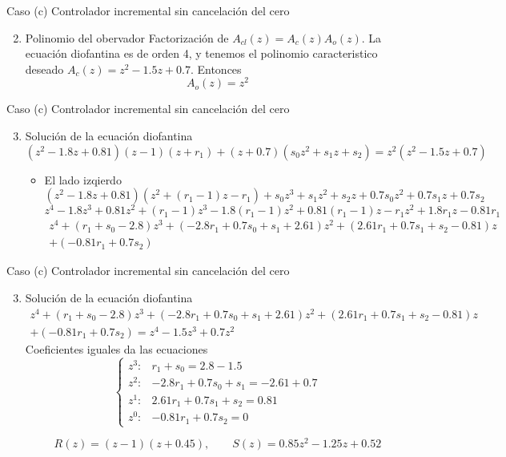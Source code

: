 \documentclass[presentation,aspectratio=169]{beamer}
\begin{document}
\begin{frame}[label={sec:orga8f2838}]{Caso (c) Controlador incremental sin cancelación del cero}
\begin{enumerate}
\setcounter{enumi}{1}
\item \alert{Polinomio del obervador} Factorización de \(A_{cl}(z) = A_c(z)A_o(z)\). La ecuación diofantina es de orden 4, y tenemos el polinomio caracteristico deseado \(A_c(z) = z^2 -1.5z + 0.7\). Entonces \alert{\[A_o(z) = z^2\]}
\end{enumerate}
\end{frame}

\begin{frame}[label={sec:org031f03b}]{Caso (c) Controlador incremental sin cancelación del cero}
\begin{enumerate}
\setcounter{enumi}{2}
\item \alert{Solución de la ecuación diofantina} 
\[(z^2 - 1.8z + 0.81)(z-1)(z+r_1) + (z+0.7)(s_0z^2 + s_1z + s_2) = z^2(z^2-1.5z+0.7) \]
\begin{itemize}
\item El lado izqierdo
\[(z^2 - 1.8z + 0.81)(z^2 +(r_1-1)z - r_1) + s_0z^3 + s_1z^2 + s_2z + 0.7s_0z^2 + 0.7s_1z + 0.7s_2\] 
\[z^4 - 1.8z^3 + 0.81z^2 + (r_1-1)z^3 - 1.8(r_1-1)z^2 + 0.81(r_1-1)z - r_1z^2 + 1.8r_1z - 0.81r_1 \]
\begin{multline*}
z^4 + (r_1 + s_0 -2.8)z^3 + (-2.8r_1 + 0.7s_0 + s_1 +2.61)z^2 + (2.61 r_1 + 0.7s_1 + s_2 -0.81)z\\   + (-0.81r_1 + 0.7s_2)\end{multline*}
\end{itemize}
\end{enumerate}
\end{frame}

\begin{frame}[label={sec:org3a84065}]{Caso (c) Controlador incremental sin cancelación del cero}
\begin{enumerate}
\setcounter{enumi}{2}
\item \alert{Solución de la ecuación diofantina} 
\begin{multline*}
  z^4 + (r_1 + s_0 -2.8)z^3 + (-2.8r_1 + 0.7s_0 + s_1 +2.61)z^2 + (2.61 r_1 + 0.7s_1 + s_2 -0.81)z\\   + (-0.81r_1 + 0.7s_2) = z^4 -1.5z^3 + 0.7z^2\end{multline*} 
Coeficientes iguales da las ecuaciones
\[ \begin{cases} z^3: & r_1 + s_0 = 2.8 -1.5\\
              z^2: & -2.8 r_1 + 0.7s_0 + s_1 = -2.61 +0.7\\
              z^1: &  2.61r_1 + 0.7s_1 + s_2 = 0.81\\
              z^0: & -0.81r_1 + 0.7s_2 = 0  \end{cases} \]

\alert{\[ R(z) = (z-1)(z + 0.45), \qquad S(z) = 0.85z^2 - 1.25z + 0.52\]}
\end{enumerate}
\end{frame}
\end{document}
